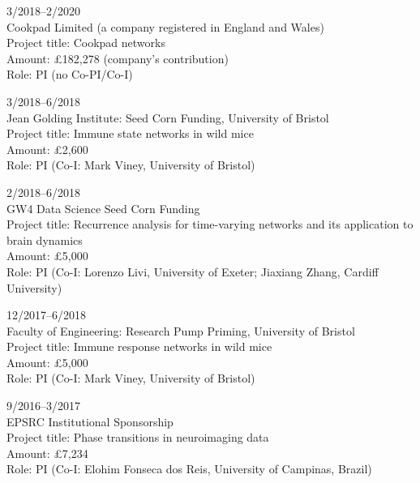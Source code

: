 \documentclass[11pt,letter]{article}
\renewenvironment{itemize}{
  \begin{list}{}{
    \setlength{\leftmargin}{1.5em}
    \setlength{\itemsep}{0.25em}
    \setlength{\parskip}{0pt}
    \setlength{\parsep}{0.25em}
  }
}{
  \end{list}
}
\begin{document}
\begin{itemize}

\item 3/2018--2/2020\\
Cookpad Limited (a company registered in England and Wales)\\
Project title: Cookpad networks\\
Amount: \pounds 182,278 (company's contribution)\\
Role: PI (no Co-PI/Co-I)

\item
3/2018--6/2018\\
Jean Golding Institute: Seed Corn Funding, University of Bristol\\
Project title: Immune state networks in wild mice\\
Amount: \pounds 2,600\\
Role: PI (Co-I: Mark Viney, University of Bristol)

\item
2/2018--6/2018\\
GW4 Data Science Seed Corn Funding\\
Project title: Recurrence analysis for time-varying networks and its application to brain dynamics
\\
Amount: \pounds 5,000\\
Role: PI (Co-I: Lorenzo Livi, University of Exeter; Jiaxiang Zhang, Cardiff University)

\item
12/2017--6/2018\\
Faculty of Engineering: Research Pump Priming, University of Bristol\\
Project title: Immune response networks in wild mice\\
Amount: \pounds 5,000\\
Role: PI (Co-I: Mark Viney, University of Bristol)

\item
9/2016--3/2017\\
EPSRC Institutional Sponsorship\\
Project title: Phase transitions in neuroimaging data\\
Amount: \pounds 7,234\\
Role: PI (Co-I: Elohim Fonseca dos Reis, University of Campinas, Brazil)


\end{itemize}
\end{document}
